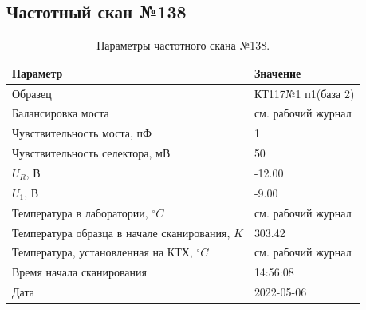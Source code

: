 \subsection{Частотный скан №138}
\begin{table}[!ht]
    \centering
    \caption{Параметры частотного скана №138.}
    \begin{tabular}{|l|l|}
        \hline
        Параметр                                       & Значение                  \\ \hline
        Образец                                        & КТ117№1 п1(база 2)        \\ \hline
        Балансировка моста                             & см. рабочий журнал        \\ \hline
        Чувствительность моста, пФ                     & 1                         \\ \hline
        Чувствительность селектора, мВ                 & 50                        \\ \hline
        $U_R$, В                                       & -12.00                    \\ \hline
        $U_1$, В                                       & -9.00                     \\ \hline
        Температура в лаборатории, $^\circ C$          & см. рабочий журнал        \\ \hline
        Температура образца в начале сканирования, $K$ & 303.42                    \\ \hline
        Температура, установленная на КТХ, $^\circ C$  & см. рабочий журнал        \\ \hline
        Время начала сканирования                      & 14:56:08                  \\ \hline
        Дата                                           & 2022-05-06                \\ \hline
    \end{tabular}
    \label{table:frequency_scan_138}
\end{table}

